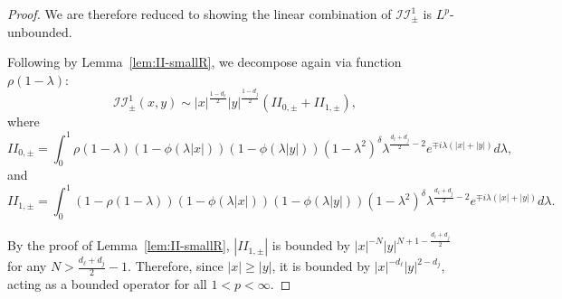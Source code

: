 \documentclass[12pt]{amsart}
\begin{document}
\begin{proof}
We are therefore reduced to showing the linear combination of $\mathcal{II}_{\pm}^1$ is $L^p$-unbounded.

Following by Lemma~\ref{lem:II-smallR}, we decompose again via function $\rho(1-\lambda)$:
\begin{equation*}
    \mathcal{II}_{\pm}^1(x,y) \sim 
|x|^{\frac{1-d_\ell}{2}}|y|^{\frac{1-d_j}{2}} \left( II_{0,\pm} + II_{1,\pm} \right),
\end{equation*}
where
\begin{equation*}
    II_{0,\pm} = \int_0^1 \rho(1-\lambda)
(1-\phi(\lambda |x|))(1-\phi(\lambda |y|))(1-\lambda^2)^\delta
\lambda^{\frac{d_\ell+d_j}{2}-2}
e^{\mp i\lambda (|x|+|y|)} d\lambda,
\end{equation*}
and
\begin{equation*}
    II_{1,\pm} = \int_0^1 \left(1-\rho(1-\lambda) \right)
(1-\phi(\lambda |x|))(1-\phi(\lambda |y|))(1-\lambda^2)^\delta
\lambda^{\frac{d_\ell+d_j}{2}-2}
e^{\mp i\lambda (|x|+|y|)} d\lambda.
\end{equation*}

By the proof of Lemma~\ref{lem:II-smallR}, $|II_{1,\pm}|$ is bounded by $|x|^{-N} |y|^{N+1-\frac{d_\ell+d_j}{2}}$ for any $N> \frac{d_\ell+d_j}{2}-1$. Therefore, since $|x|\ge |y|$, it is bounded by $|x|^{-d_\ell} |y|^{2-d_j}$, acting as a bounded operator for all $1<p<\infty$.


\end{proof}
\end{document}
